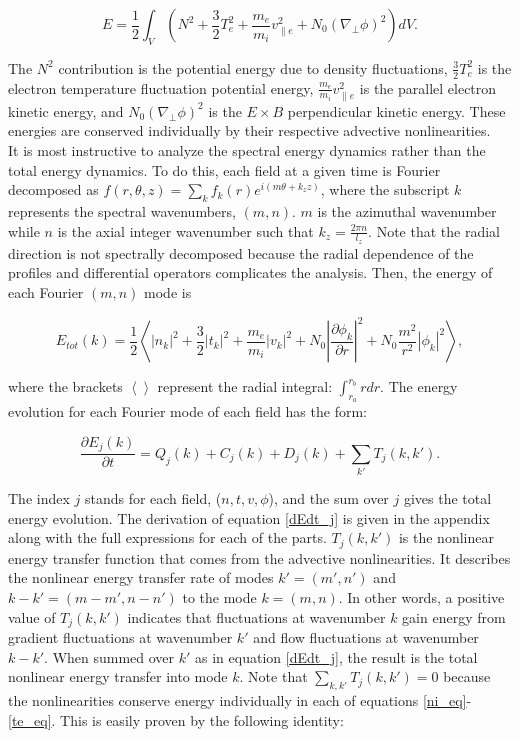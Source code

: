 \documentclass[12pt]{article}
\def\beq{\begin{equation}}
\def\eeq{\end{equation}}
\newcommand{\pdiff}[2]{\frac{\partial#1}{\partial#2}}
\def\grad{\nabla}
\newcommand{\gradperp}{\grad_\perp}
\newcommand{\vpe}{v_{\parallel e}}
\begin{document}
\beq
\label{energy_eq}
E = \frac{1}{2} \int_V  (N^2 + \frac{3}{2} T_e^2 + \frac{m_e}{m_i} \vpe^2 + N_0 (\gradperp \phi)^2 ) dV.
\eeq

The $N^2$ contribution is the potential energy due to density fluctuations, $\frac{3}{2} T_e^2$ is the electron temperature fluctuation potential energy,
$\frac{m_e}{m_i} \vpe^2$ is the parallel electron kinetic energy, and $N_0 (\gradperp \phi)^2$ is the $E \times B$ perpendicular kinetic energy.
These energies are conserved individually by their respective advective nonlinearities. \\

It is most instructive to analyze the spectral energy dynamics rather than the total energy dynamics. To do this, each field at a given time is Fourier decomposed as 
$f(r,\theta,z) = \sum_k f_k(r) e^{i (m \theta + k_z z )}$,
where the subscript $k$ represents the spectral wavenumbers, $(m,n)$. $m$ is the azimuthal wavenumber while $n$ is the axial integer wavenumber such that $k_z = \frac{2 \pi n}{l_z}$. Note that
the radial direction is not spectrally decomposed because the radial dependence of the profiles and differential operators complicates the analysis.
Then, the energy of each Fourier $(m,n)$ mode is

\beq
\label{E_k}
E_{tot}(k) = \frac{1}{2} \left< |n_k|^2 + \frac{3}{2} |t_k|^2 + \frac{m_e}{m_i} |v_k|^2 + N_0 \left| \pdiff{\phi_k}{r} \right|^2 + N_0 \frac{m^2}{r^2} |\phi_k|^2 \right>,
\eeq

where the brackets $\left< \right>$ represent the radial integral: $\int_{r_a}^{r_b} r dr$.
The energy evolution for each Fourier mode of each field has the form:

\beq
\label{dEdt_j}
\pdiff{E_{j}(k)}{t} = Q_{j}(k) + C_{j}(k) + D_j(k) + \sum_{k'} T_{j}(k,k').
\eeq

The index $j$ stands for each field, ($n,t,v,\phi$), and the sum over $j$ gives the total energy evolution. The derivation of equation \ref{dEdt_j} 
is given in the appendix along with the full expressions for each of the parts. $T_{j}(k,k')$ is the nonlinear energy transfer function that comes from the advective
nonlinearities.  It describes the nonlinear energy transfer rate of modes $k'=(m',n')$ and $k-k'=(m-m',n-n')$ to the mode $k=(m,n)$. 
In other words, a positive value of $T_{j}(k,k')$ indicates that fluctuations
at wavenumber $k$ gain energy from gradient fluctuations at wavenumber $k'$ and flow fluctuations at wavenumber $k-k'$.
When summed over $k'$ as in equation \ref{dEdt_j}, the result is the total
nonlinear energy transfer into mode $k$. Note that $\sum_{k,k'} T_{j}(k,k') = 0$ because the nonlinearities conserve energy individually in each of equations \ref{ni_eq}-\ref{te_eq}.
This is easily proven by the following identity:
\end{document}
